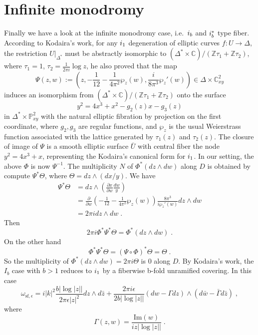 \section{Infinite monodromy}
Finally we have a look at the infinite monodromy case, i.e.\ $\uppercase\expandafter{\romannumeral1}_b$ and $\uppercase\expandafter{\romannumeral1}_b^*$ type fiber. According to Kodaira's work, for any $\uppercase\expandafter{\romannumeral1}_1$ degeneration of elliptic curves $f\colon U\rightarrow \Delta$, the restriction $U|_{\Delta^*}$ must be abstractly isomorphic to $(\Delta^*\times\mathbb{C})/(\mathbb{Z}\tau_1+\mathbb{Z}\tau_2)$, where $\tau_1=1$, $\tau_2=\frac{1}{2\pi i}\log z$, he also proved that the map
$$\Psi(z,w):=\left(z,-\frac{1}{12}-\frac{1}{4\pi^2}\wp_z(w),\frac{i}{8\pi^3}\wp_z'(w)\right)\in \Delta\times\mathbb{C}_{xy}^2$$
induces an isomorphism from $(\Delta^*\times\mathbb{C})/(\mathbb{Z}\tau_1+\mathbb{Z}\tau_2)$ onto the surface
$$y^2=4x^3+x^2-g_2(z)x-g_3(z)$$
in $\Delta^*\times\mathbb{P}^2_{xy}$ with the natural elliptic fibration by projection on the first coordinate, where $g_2,g_3$ are regular functions, and $\wp_z$ is the usual Weierstrass function associated with the lattice generated by $\tau_1(z)$ and $\tau_2(z)$. The closure of image of $\Psi$ is a smooth elliptic surface $\bar{U}$ with central fiber the node $y^2=4x^3+x$, representing the Kodaira's canonical form for $\uppercase\expandafter{\romannumeral1}_1$. In our setting, the above $\Phi$ is now $\Psi^{-1}$. The multiplicity $N$ of $\Phi^*(dz\wedge dw)$ along $D$ is obtained by compute $\Psi^*\Theta$, where $\Theta=dz\wedge(dx/y)$. We have
\begin{displaymath}
\begin{split}
\Psi^*\Theta&=dz\wedge\left(\frac{\partial x}{\partial w}\frac{dw}{y}\right)\\
&=\frac{\partial}{\partial w}\left(-\frac{1}{12}-\frac{1}{4\pi^2}\wp_z(w)\right)\frac{8\pi^3}{i\wp_z'(w)}dz\wedge dw\\
&=2\pi idz\wedge dw\; .
\end{split}
\end{displaymath}
Then $$2\pi i\Phi^*\Psi^*\Theta=\Phi^*(dz\wedge dw)\; .$$
On the other hand
$$\Phi^*\Psi^*\Theta=(\Psi\circ\Phi)^*\Theta=\Theta\; .$$
So the multiplicity of $\Phi^*(dz\wedge dw)=2\pi i\Theta$ is 0 along $D$. By Kodaira's work, the $I_b$ case with $b>1$ reduces to $\uppercase\expandafter{\romannumeral1}_1$ by a fiberwise b-fold unramified covering. In this case
$$\omega_{\textrm{sf},\epsilon}=i|k|^2\frac{b|\log|z||}{2\pi\epsilon |z|^2}dz\wedge d\bar{z}+\frac{2\pi i\epsilon}{2b|\log|z||}(dw-\Gamma dz)\wedge(d\bar{w}-\bar{\Gamma}d\bar{z})\; ,$$
where
$$\Gamma(z,w)=\frac{\textrm{Im}(w)}{iz|\log|z||}\; .$$

